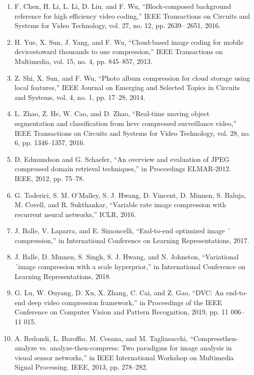 \documentclass{article}
\begin{document}
\begin{enumerate}
	\item F. Chen, H. Li, L. Li, D. Liu, and F. Wu, “Block-composed background
	reference for high efficiency video coding,” IEEE Transactions on
	Circuits and Systems for Video Technology, vol. 27, no. 12, pp. 2639–
	2651, 2016.

	\item H. Yue, X. Sun, J. Yang, and F. Wu, “Cloud-based image coding for mobile devicestoward thousands to one compression,” IEEE Transactions
	on Multimedia, vol. 15, no. 4, pp. 845–857, 2013.

	\item Z. Shi, X. Sun, and F. Wu, “Photo album compression for cloud storage
	using local features,” IEEE Journal on Emerging and Selected Topics
	in Circuits and Systems, vol. 4, no. 1, pp. 17–28, 2014.
	
	\item L. Zhao, Z. He, W. Cao, and D. Zhao, “Real-time moving object segmentation and classification from hevc compressed surveillance video,” IEEE
	Transactions on Circuits and Systems for Video Technology, vol. 28,
	no. 6, pp. 1346–1357, 2016.

	\item D. Edmundson and G. Schaefer, “An overview and evaluation of JPEG
	compressed domain retrieval techniques,” in Proceedings ELMAR-2012.
	IEEE, 2012, pp. 75–78.

	\item G. Toderici, S. M. O’Malley, S. J. Hwang, D. Vincent, D. Minnen,
	S. Baluja, M. Covell, and R. Sukthankar, “Variable rate image compression with recurrent neural networks,” ICLR, 2016.

	\item J. Balle, V. Laparra, and E. Simoncelli, “End-to-end optimized image ´
	compression,” in International Conference on Learning Representations,
	2017.

	\item J. Balle, D. Minnen, S. Singh, S. J. Hwang, and N. Johnston, “Variational ´image compression with a scale hyperprior,” in International Conference
	on Learning Representations, 2018.

	\item G. Lu, W. Ouyang, D. Xu, X. Zhang, C. Cai, and Z. Gao, “DVC: An
	end-to-end deep video compression framework,” in Proceedings of the
	IEEE Conference on Computer Vision and Pattern Recognition, 2019,
	pp. 11 006–11 015.

	\item A. Redondi, L. Baroffio, M. Cesana, and M. Tagliasacchi, “Compressthen-analyze vs. analyze-then-compress: Two paradigms for image analysis in visual sensor networks,” in IEEE International Workshop on
	Multimedia Signal Processing. IEEE, 2013, pp. 278–282.


\end{enumerate}
\end{document}
